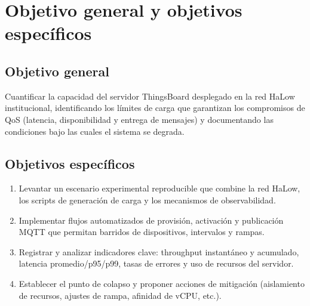 \section{Objetivo general y objetivos espec\'ificos}
\subsection{Objetivo general}
Cuantificar la capacidad del servidor ThingsBoard desplegado en la red HaLow institucional, identificando los l\'imites de carga que garantizan los compromisos de QoS (latencia, disponibilidad y entrega de mensajes) y documentando las condiciones bajo las cuales el sistema se degrada.

\subsection{Objetivos espec\'ificos}
\begin{enumerate}
  \item Levantar un escenario experimental reproducible que combine la red HaLow, los scripts de generaci\'on de carga y los mecanismos de observabilidad.
  \item Implementar flujos automatizados de provisi\'on, activaci\'on y publicaci\'on MQTT que permitan barridos de dispositivos, intervalos y rampas.
  \item Registrar y analizar indicadores clave: throughput instant\'aneo y acumulado, latencia promedio/p95/p99, tasas de errores y uso de recursos del servidor.
  \item Establecer el punto de colapso y proponer acciones de mitigaci\'on (aislamiento de recursos, ajustes de rampa, afinidad de vCPU, etc.).
\end{enumerate}
